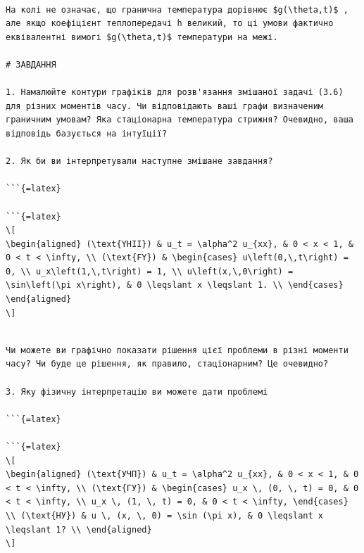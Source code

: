 \documentclass[
]{article}
\begin{document}
\begin{verbatim}

На колі не означає, що гранична температура дорівнює $g(\theta,t)$ , але якщо коефіцієнт теплопередачі h великий, то ці умови фактично еквівалентні вимогі $g(\theta,t)$ температури на межі.

# ЗАВДАННЯ

1. Намалюйте контури графіків для розв'язання змішаної задачі (3.6) для різних моментів часу. Чи відповідають ваші графи визначеним граничним умовам? Яка стаціонарна температура стрижня? Очевидно, ваша відповідь базується на інтуїції?

2. Як би ви інтерпретували наступне змішане завдання?

```{=latex}

```{=latex}
\[
\begin{aligned} (\text{YHII}) & u_t = \alpha^2 u_{xx}, & 0 < x < 1, & 0 < t < \infty, \\ (\text{FY}) & \begin{cases} u\left(0,\,t\right) = 0, \\ u_x\left(1,\,t\right) = 1, \\ u\left(x,\,0\right) = \sin\left(\pi x\right), & 0 \leqslant x \leqslant 1. \\ \end{cases} \end{aligned}
\]
\end{verbatim}

\begin{verbatim}

Чи можете ви графічно показати рішення цієї проблеми в різні моменти часу? Чи буде це рішення, як правило, стаціонарним? Це очевидно?

3. Яку фізичну інтерпретацію ви можете дати проблемі

```{=latex}

```{=latex}
\[
\begin{aligned} (\text{УЧП}) & u_t = \alpha^2 u_{xx}, & 0 < x < 1, & 0 < t < \infty, \\ (\text{ГУ}) & \begin{cases} u_x \, (0, \, t) = 0, & 0 < t < \infty, \\ u_x \, (1, \, t) = 0, & 0 < t < \infty, \end{cases} \\ (\text{НУ}) & u \, (x, \, 0) = \sin (\pi x), & 0 \leqslant x \leqslant 1? \\ \end{aligned}
\]
\end{verbatim}
\end{document}
